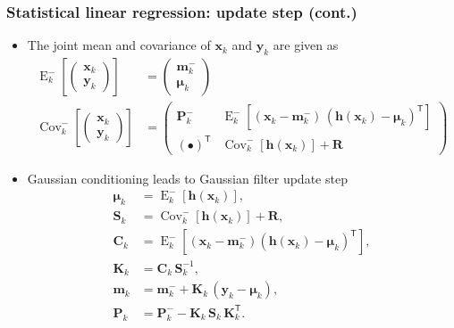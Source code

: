 \documentclass[first=dgreen,second=purple,presentation]{elecslides}
\newcommand{\mbf}[1]{\mathbf{#1}}
\newcommand{\mathbold}[1]{\bm{#1}}
\newcommand{\T}[0]{\mathsf{T}}
\DeclareMathOperator{\Cov}{Cov}
\DeclareMathOperator{\E}{E}
\newcommand{\vmu}[0]{\mathbold{\mu}}
\newcommand{\vh}{\mbf{h}}
\newcommand{\vm}{\mbf{m}}
\newcommand{\vx}{\mbf{x}}
\newcommand{\vy}{\mbf{y}}
\newcommand{\MC}{\mbf{C}}
\newcommand{\MK}{\mbf{K}}
\newcommand{\MP}{\mbf{P}}
\newcommand{\MR}{\mbf{R}}
\newcommand{\MS}{\mbf{S}}
\begin{document}
\begin{frame}
 \frametitle{Statistical linear regression: update step (cont.)}

\begin{itemize}[<+->]
\item The \alert{joint mean and covariance} of $\vx_k$ and $\vy_k$ are given as
%
\begin{equation}
\begin{split}
  \E_k^-\left[ \begin{pmatrix} \vx_k \\ \vy_k \end{pmatrix} \right]
  &= \begin{pmatrix} \vm_k^- \\ \vmu_k \end{pmatrix} \\
  \Cov_k^-\left[ \begin{pmatrix} \vx_k \\ \vy_k \end{pmatrix} \right]
  &= \begin{pmatrix}
     \MP_k^-  & \E_k^-\left[ (\vx_{k} - \vm_{k}^-) \, (\vh(\vx_{k}) - \vmu_k)^\T \right] \\
      (\bullet)^\T & \Cov_k^-[ \vh(\vx_{k}) ] + \MR
      \end{pmatrix}
\end{split}
\nonumber
\end{equation}

\item \alert{Gaussian conditioning} leads to Gaussian filter update step
%
{\small
\begin{equation}
\begin{split}
  \vmu_k &= \E_k^-[ \vh(\vx_{k}) ], \\
   \MS_k &= \Cov_k^-[ \vh(\vx_{k}) ] + \MR, \\
   \MC_k &= \E_k^-\left[ (\vx_{k} - \vm_{k}^-) (\vh(\vx_{k}) - \vmu_k)^\T \right], \\
   \MK_k &= \MC_k \, \MS_k^{-1}, \\
   \vm_k &= \vm_k^- + \MK_k \, (\vy_k - \vmu_k), \\
   \MP_k &= \MP_k^- - \MK_k \, \MS_k \, \MK_k^\T.
\end{split}
\nonumber
\end{equation}
}
\end{itemize}
\end{frame}


\end{document}
